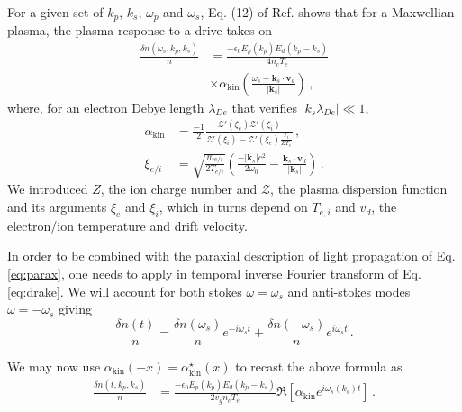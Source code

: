 \documentclass[
 reprint,
 amsmath,amssymb,
 aps,
]{revtex4-1}
\begin{document}
For a given set of $k_p$, $k_s$, $\omega_p$ and $\omega_s$, Eq. (12) of  Ref. \cite[]{POF_Drake_1973} shows that  for  a Maxwellian plasma, the plasma response to a drive  takes on 
\begin{align}
 \frac{ \delta n (\omega_s, k_p,k_s) }{n}  &=   \frac{ -\epsilon_0 E_p(k_p) E_d(k_p-k_s) }{ 4 n_c T_e } \nonumber \\  &\times \alpha_\mathrm{kin}\left(\frac{\omega_s- \mathbf{k}_s\cdot \mathbf{v}_d}{\vert \mathbf{k}_s \vert }\right)   \, ,\label{eq:drake}
 \end{align}
 where, for an electron Debye length $\lambda_{De}$ that verifies $\vert k_s \lambda_{De} \vert \ll 1$, %
 \begin{align}
\alpha_\mathrm{kin} &=  \frac{-1}{2}\frac{ \mathcal{Z}'( \xi_e)\mathcal{Z}'( \xi_i)    }{   \mathcal{Z}'( \xi_i) - \mathcal{Z}'( \xi_e)\frac{  T_i }{ ZT_e } }    \, , \label{eq:drakea}\\
\xi_{e/i } &=  \sqrt{ \frac{ m_{e/i } }{ 2T_{e/i }}  } \left( \frac{ -\vert \mathbf{k}_s\vert c^2  }{  2\omega_0 }  - \frac{    \mathbf{k}_s \cdot \mathbf{v}_d }{  \vert \mathbf{k}_s\vert }\right)  \label{eq:xiie}   \,  .
\end{align}
We introduced $Z$, the ion charge number and  $ \mathcal{Z}$, the plasma dispersion function \cite{Fried_Gell-Mann_1960} and its arguments $\xi_{e } $ and $\xi_{i }$, which in turns depend on $T_{e,i}$ and $v_d$, the electron/ion temperature and  drift velocity.

In order to be combined with the paraxial description of light propagation of Eq. \eqref{eq:parax}, one needs to apply in temporal inverse Fourier transform of Eq. \eqref{eq:drake}. We will account for both stokes $\omega=\omega_s$ and anti-stokes modes $\omega=-\omega_s$ giving 
\begin{equation}\label{eq:sa}
     \frac{ \delta n (t) }{n}= \frac{ \delta n (\omega_s) }{n}e^{-i\omega_st} + \frac{ \delta n (-\omega_s) }{n}e^{i\omega_st}\, .
\end{equation}

We may now use $\alpha_\mathrm{kin}(-x) = \alpha^\star_\mathrm{kin}(x) $ to recast the above formula as 
\begin{align}
\frac{ \delta n (t,k_p,k_s ) }{n}  &=   \frac{ -\epsilon_0 E_p(k_p) E_d(k_p-k_s)  }{ 2 v_g n_c T_e } 
 \Re \left[ \alpha_\mathrm{kin}  e^{ i\omega_s(k_s) t} \right]  \, .\label{eq:drakef}
\end{align}
\end{document}
